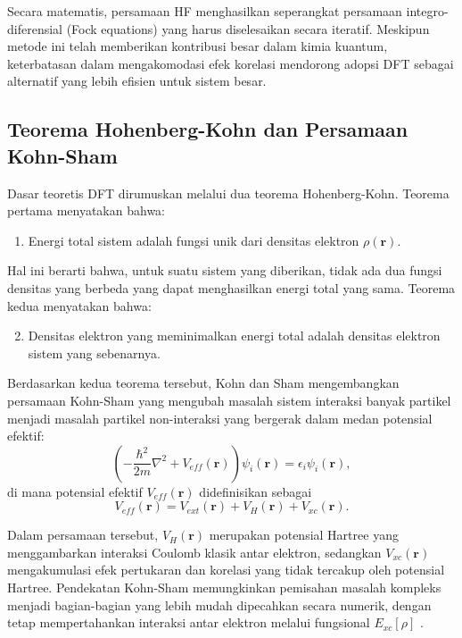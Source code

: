 Secara matematis, persamaan HF menghasilkan seperangkat persamaan integro-diferensial (Fock equations) yang harus diselesaikan secara iteratif. Meskipun metode ini telah memberikan kontribusi besar dalam kimia kuantum, keterbatasan dalam mengakomodasi efek korelasi mendorong adopsi DFT sebagai alternatif yang lebih efisien untuk sistem besar.

\subsection{Teorema Hohenberg-Kohn dan Persamaan Kohn-Sham}
Dasar teoretis DFT dirumuskan melalui dua teorema Hohenberg-Kohn. Teorema pertama menyatakan bahwa:
\begin{enumerate}
    \item Energi total sistem adalah fungsi unik dari densitas elektron \(\rho(\mathbf{r})\).
\end{enumerate}
Hal ini berarti bahwa, untuk suatu sistem yang diberikan, tidak ada dua fungsi densitas yang berbeda yang dapat menghasilkan energi total yang sama. Teorema kedua menyatakan bahwa:
\begin{enumerate}
    \setcounter{enumi}{1}
    \item Densitas elektron yang meminimalkan energi total adalah densitas elektron sistem yang sebenarnya.
\end{enumerate}

Berdasarkan kedua teorema tersebut, Kohn dan Sham mengembangkan persamaan Kohn-Sham yang mengubah masalah sistem interaksi banyak partikel menjadi masalah partikel non-interaksi yang bergerak dalam medan potensial efektif:
\begin{equation}
    \left(-\frac{\hbar^2}{2m}\nabla^2 + V_{eff}(\mathbf{r})\right)\psi_i(\mathbf{r}) = \epsilon_i \psi_i(\mathbf{r}),
\end{equation}
di mana potensial efektif \(V_{eff}(\mathbf{r})\) didefinisikan sebagai
\begin{equation}
    V_{eff}(\mathbf{r}) = V_{ext}(\mathbf{r}) + V_H(\mathbf{r}) + V_{xc}(\mathbf{r}).
\end{equation}

Dalam persamaan tersebut, \(V_H(\mathbf{r})\) merupakan potensial Hartree yang menggambarkan interaksi Coulomb klasik antar elektron, sedangkan \(V_{xc}(\mathbf{r})\) mengakumulasi efek pertukaran dan korelasi yang tidak tercakup oleh potensial Hartree. Pendekatan Kohn-Sham memungkinkan pemisahan masalah kompleks menjadi bagian-bagian yang lebih mudah dipecahkan secara numerik, dengan tetap mempertahankan interaksi antar elektron melalui fungsional \(E_{xc}[\rho]\) \citep{kohn_self-consistent_1965, Perdew1996}.

